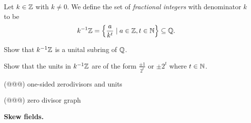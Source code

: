\begin{dfn} \label{dfn:fractional-integers}
Let \(k \in \mathbb{Z}\) with \(k \neq 0\). We define the set of \emph{fractional integers} with denominator \(k\) to be \[ {k}^{-1}\mathbb{Z} = \left\{ \frac{a}{k^t} \mid a \in \mathbb{Z}, t \in \mathbb{N} \right\} \subseteq \mathbb{Q}. \]
\end{dfn}

\begin{exercise}
Show that \({k}^{-1}\mathbb{Z}\) is a unital subring of \(\mathbb{Q}\).
\end{exercise}

\begin{exercise}
Show that the units in \({k}^{-1}\mathbb{Z}\) are of the form \(\frac{\pm 1}{2^t}\) or \(\pm 2^t\) where \(t \in \mathbb{N}\).
\end{exercise}

(@@@) one-sided zerodivisors and units

(@@@) zero divisor graph

\textbf{Skew fields.}
